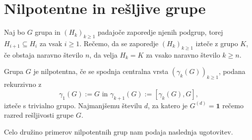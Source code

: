 \section{Nilpotentne in rešljive grupe}




\begin{definicija}
\label{def_iztek_zaporedja}
Naj bo $G$ grupa in $(H_k)_{k \ge 1}$ padajoče zaporedje njenih podgrup, torej $H_{i + 1} \subseteq H_{i}$ za vsak $i \ge 1$. 
Rečemo, da se zaporedje $(H_k)_{k \ge 1}$ izteče z grupo $K$, če obstaja naravno število $n$, da velja $H_k = K$ za vsako naravno število $k \ge n$.
\end{definicija}


\begin{definicija}
\label{def_nilpotentna_grupa}
Grupa $G$ je nilpotentna, če se spodnja centralna vrsta $(\gamma_k(G))_{k \ge 1}$, podana rekurzivno z \begin{equation*}
\gamma_1(G) := G \text{ in } \gamma_{k +1}(G) := [\gamma_k(G), G],
\end{equation*}  
izteče s trivialno grupo. Najmanjšemu številu $d$, za katero je $G^{(d)} = \mathbf{1}$ rečemo razred rešljivosti grupe $G$.    
\end{definicija}

Celo družino primerov nilpotentnih grup nam podaja naslednja ugotovitev.

